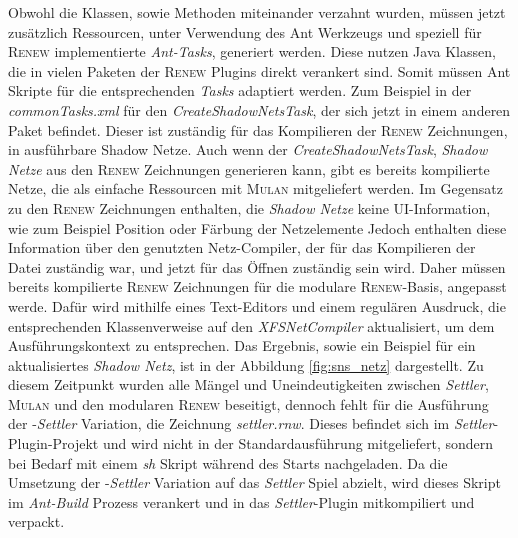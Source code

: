 	Obwohl die Klassen, sowie Methoden miteinander verzahnt wurden, müssen jetzt zusätzlich Ressourcen, unter Verwendung des Ant Werkzeugs und speziell für \textsc{Renew} implementierte \textit{Ant-Tasks}, generiert werden. Diese nutzen Java Klassen, die in vielen Paketen der \textsc{Renew} Plugins direkt verankert sind. Somit müssen Ant Skripte für die entsprechenden \textit{Tasks} adaptiert werden. Zum Beispiel in der \textit{commonTasks.xml} für den \textit{CreateShadowNetsTask}, der sich jetzt in einem anderen Paket befindet. Dieser ist zuständig für das Kompilieren der \textsc{Renew} Zeichnungen, in ausführbare Shadow Netze. Auch wenn der \textit{CreateShadowNetsTask}, \textit{Shadow Netze} aus den \textsc{Renew} Zeichnungen generieren kann, gibt es bereits kompilierte Netze, die als einfache Ressourcen mit \textsc{Mulan} mitgeliefert werden. \newline
	Im Gegensatz zu den \textsc{Renew} Zeichnungen enthalten, die \textit{Shadow Netze} keine UI-Information, wie zum Beispiel Position oder Färbung der Netzelemente Jedoch enthalten diese Information über den genutzten Netz-Compiler, der für das Kompilieren der Datei zuständig war, und jetzt für das Öffnen zuständig sein wird. Daher müssen bereits kompilierte \textsc{Renew} Zeichnungen für die modulare \textsc{Renew}-Basis, angepasst werde. Dafür wird mithilfe eines Text-Editors und einem regulären Ausdruck, die entsprechenden Klassenverweise auf den \textit{XFSNetCompiler} aktualisiert, um dem Ausführungskontext zu entsprechen. \newline
	Das Ergebnis, sowie ein Beispiel für ein aktualisiertes \textit{Shadow Netz}, ist in der Abbildung \ref{fig:sns_netz} dargestellt. \bigbreak
	Zu diesem Zeitpunkt wurden alle Mängel und Uneindeutigkeiten zwischen \textit{Settler}, \textsc{Mulan} und den modularen \textsc{Renew} beseitigt, dennoch fehlt für die Ausführung der -\textit{Settler} Variation,  die Zeichnung \textit{settler.rnw}. Dieses befindet sich im \textit{Settler}-Plugin-Projekt und wird nicht in der Standardausführung mitgeliefert, sondern bei Bedarf mit einem \textit{sh} Skript während des Starts nachgeladen. \newline
	Da die Umsetzung der -\textit{Settler} Variation auf das \textit{Settler} Spiel abzielt, wird dieses Skript im \textit{Ant-Build} Prozess verankert und in das \textit{Settler}-Plugin mitkompiliert und verpackt. \newline

